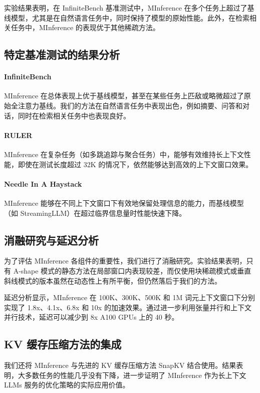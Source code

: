 \documentclass[twocolumn, 10pt]{article} %
\theoremstyle{remark}
\begin{document}
实验结果表明，在 InfiniteBench 基准测试中，MInference 在多个任务上超过了基线模型，尤其是在自然语言任务中，同时保持了模型的原始性能。此外，在检索相关任务中，MInference 的表现优于其他稀疏方法。

\subsection{特定基准测试的结果分析}

\paragraph{InfiniteBench} MInference 在总体表现上优于基线模型，甚至在某些任务上匹敌或略微超过了原始全注意力基线。我们的方法在自然语言任务中表现出色，例如摘要、问答和对话，同时在检索相关任务中也表现良好。

\paragraph{RULER} MInference 在复杂任务（如多跳追踪与聚合任务）中，能够有效维持长上下文性能，即使在测试长度超过 32K 的情况下，依然能够达到高效的上下文窗口效果。

\paragraph{Needle In A Haystack} MInference 能够在不同上下文窗口下有效地保留处理信息的能力，而基线模型（如 StreamingLLM）在超过临界信息量时性能快速下降。

\subsection{消融研究与延迟分析}
为了评估 MInference 各组件的重要性，我们进行了消融研究。实验结果表明，只有 A-shape 模式的静态方法在局部窗口内表现较差，而仅使用块稀疏模式或垂直斜线模式的版本虽然在动态性上有所平衡，但仍然落后于我们的方法。

延迟分析显示，MInference 在 100K、300K、500K 和 1M 词元上下文窗口下分别实现了 1.8x、4.1x、6.8x 和 10x 的加速效果。通过进一步利用张量并行和上下文并行技术，延迟可以减少到 8x A100 GPUs 上的 40 秒。

\subsection{KV 缓存压缩方法的集成}
我们还将 MInference 与先进的 KV 缓存压缩方法 SnapKV 结合使用。结果表明，大多数任务的性能几乎没有下降，进一步证明了 MInference 作为长上下文 LLMs 服务的优化策略的实际应用价值。
\end{document}
